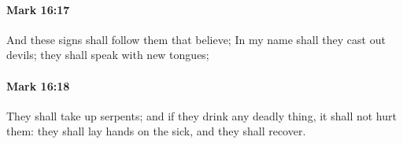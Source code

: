 		\paragraph{Mark 16:17} %
			\label{MARK-16-17}

			And these signs shall follow them that believe; In my name shall they cast out devils; they shall speak with new tongues;

			\begin{framed}
			\scriptsize
				\begin{compactdesc}
					\item[SBLG] 
				\end{compactdesc}
			\end{framed}

		\paragraph{Mark 16:18} %
			\label{MARK-16-18}

			They shall take up serpents; and if they drink any deadly thing, it shall not hurt them: they shall lay hands on the sick, and they shall recover.

